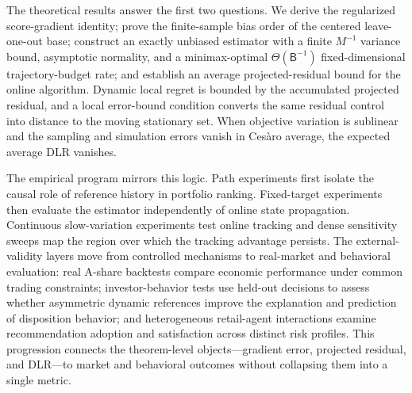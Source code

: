 The theoretical results answer the first two questions.  We derive the regularized \CPT score-gradient identity; prove the finite-sample bias order of the centered leave-one-out base; construct an exactly unbiased estimator with a finite $M^{-1}$ variance bound, asymptotic normality, and a minimax-optimal $\Theta(\mathsf B^{-1})$ fixed-dimensional trajectory-budget rate; and establish an average projected-residual bound for the online algorithm.  Dynamic local regret is bounded by the accumulated projected residual, and a local error-bound condition converts the same residual control into distance to the moving stationary set.  When objective variation is sublinear and the sampling and simulation errors vanish in Ces\`aro average, the expected average DLR vanishes.

The empirical program mirrors this logic.  Path experiments first isolate the causal role of reference history in portfolio ranking.  Fixed-target experiments then evaluate the estimator independently of online state propagation.  Continuous slow-variation experiments test online tracking and dense sensitivity sweeps map the region over which the tracking advantage persists.  The external-validity layers move from controlled mechanisms to real-market and behavioral evaluation: real A-share backtests compare economic performance under common trading constraints; investor-behavior tests use held-out decisions to assess whether asymmetric dynamic references improve the explanation and prediction of disposition behavior; and heterogeneous retail-agent interactions examine recommendation adoption and satisfaction across distinct risk profiles.  This progression connects the theorem-level objects---gradient error, projected residual, and DLR---to market and behavioral outcomes without collapsing them into a single metric.

